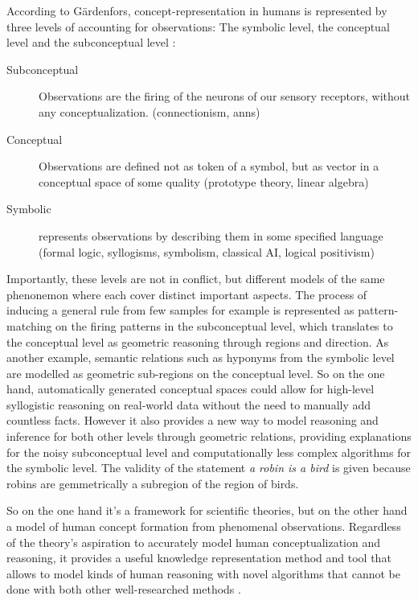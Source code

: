 According to Gärdenfors, concept-representation in humans is represented by three levels of accounting for observations: The symbolic level, the conceptual level and the subconceptual level \cite[204]{Gardenfors2000a}:
\begin{description}
    \item[Subconceptual] Observations are the firing of the neurons of our sensory receptors, without any conceptualization.  (connectionism, \glspl{ann})
    \item[Conceptual] Observations are defined not as token of a symbol, but as vector in a conceptual space of some quality  (prototype theory, linear algebra)
    \item[Symbolic] represents observations by describing them in some specified language (formal logic, syllogisms, symbolism, classical AI, logical positivism)
\end{description}

Importantly, these levels are not in conflict, but different models of the same phenonemon where each cover distinct important aspects. The process of inducing a general rule from few samples for example is represented as pattern-matching on the firing patterns in the subconceptual level, which translates to the conceptual level as geometric reasoning through regions and direction. As another example, semantic relations such as hyponyms from the symbolic level are modelled as geometric sub-regions on the conceptual level. So on the one hand, automatically generated conceptual spaces could allow for high-level syllogistic reasoning on real-world data without the need to manually add countless facts. However it also provides a new way to model reasoning and inference for both other levels through geometric relations, providing explanations for the noisy subconceptual level and computationally less complex algorithms for the symbolic level. The validity of the statement \textit{a robin is a bird} is given because robins are gemmetrically a subregion of the region of birds.

So on the one hand it's a framework for scientific theories, but on the other hand a model of human concept formation from phenomenal observations. Regardless of the theory's aspiration to accurately model human conceptualization and reasoning, it provides a useful knowledge representation method and tool that allows to model kinds of human reasoning with novel algorithms that cannot be done with both other well-researched methods \cite[Sec.~6.7]{Gardenfors2000a}. 


